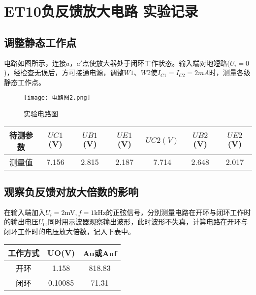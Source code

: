 \documentclass[dvipsnames, svgnames,a4paper,11pt]{article}
\begin{document}
	\section{ET10负反馈放大电路 \quad\heiti 实验记录}
	
\subsection{调整静态工作点}
	电路如图所示，连接$a$，$a'$点使放大器处于闭环工作状态。输入端对地短路($U_i=0$)，经检查无误后，方可接通电源，调整$W1$、$W2$使$I_{C1}=I_{C2}=2mA$时，测量各级静态工作点。
	\begin{figure}[H]
		\centering
		\texttt{[image: 电路图2.png]}
		\caption{实验电路图}
		\label{}
	\end{figure}
	\begin{table}[H]
		\centering
		\begin{tabular}{|c|c|c|c|c|c|c|}
			\hline
			待测参数 & $UC1$(V) & $UB1$(V) & $UE1$(V) & $UC2(V)$ &$ UB2$(V) & $UE2$(V) \\
			\hline
			测量值 &7.156 &2.815 & 2.187& 7.714& 2.648&2.017 \\
			\hline
		\end{tabular}
	
		\end{table}
		\subsection{观察负反馈对放大倍数的影响}
		在输入端加入$U_i=2$mV$,f=1$kHz的正弦信号，分别测量电路在开环与闭环工作时的输出电压$U_{0}$,同时用示波器观察输出波形，此时波形不失真，计算电路在开环与闭环工作时的电压放大倍数，记入下表中。


		\begin{table}[H]
			\centering
			\begin{tabular}{|c|c|c|}
				\hline
				工作方式 & UO(V) & Au或Auf \\
			
			
				\hline
				开环 & 1.158& 818.83\\
				\hline
				闭环 & 0.10085&71.31 \\
				\hline
			\end{tabular}
			\end{table}
\end{document}
